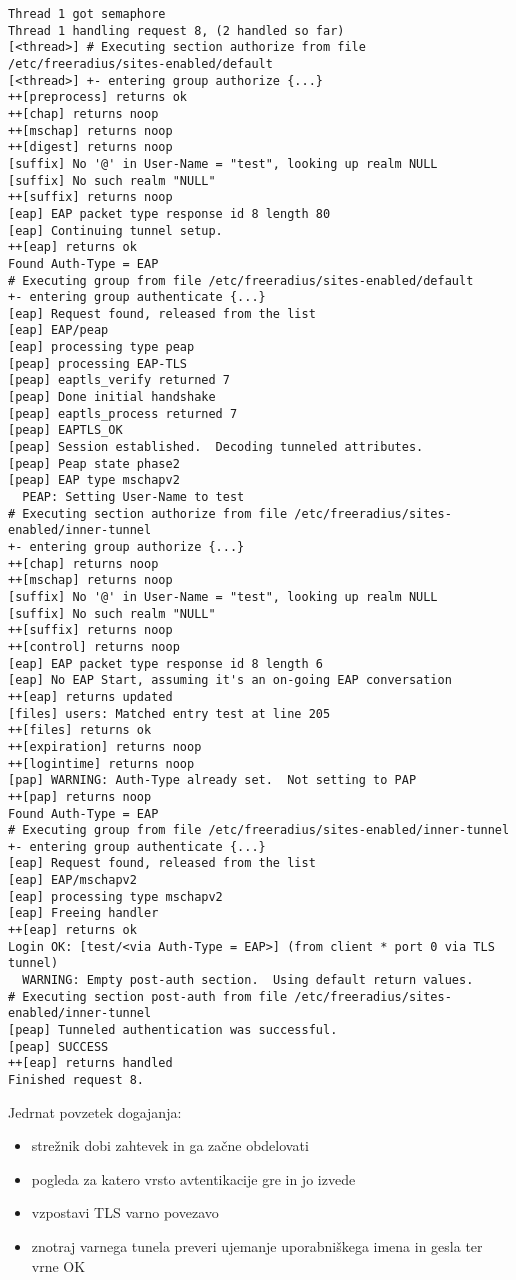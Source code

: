 \documentclass[12pt]{article}
\begin{document}
\begin{verbatim}
Thread 1 got semaphore
Thread 1 handling request 8, (2 handled so far)
[<thread>] # Executing section authorize from file /etc/freeradius/sites-enabled/default
[<thread>] +- entering group authorize {...}
++[preprocess] returns ok
++[chap] returns noop
++[mschap] returns noop
++[digest] returns noop
[suffix] No '@' in User-Name = "test", looking up realm NULL
[suffix] No such realm "NULL"
++[suffix] returns noop
[eap] EAP packet type response id 8 length 80
[eap] Continuing tunnel setup.
++[eap] returns ok
Found Auth-Type = EAP
# Executing group from file /etc/freeradius/sites-enabled/default
+- entering group authenticate {...}
[eap] Request found, released from the list
[eap] EAP/peap
[eap] processing type peap
[peap] processing EAP-TLS
[peap] eaptls_verify returned 7 
[peap] Done initial handshake
[peap] eaptls_process returned 7 
[peap] EAPTLS_OK
[peap] Session established.  Decoding tunneled attributes.
[peap] Peap state phase2
[peap] EAP type mschapv2
  PEAP: Setting User-Name to test
# Executing section authorize from file /etc/freeradius/sites-enabled/inner-tunnel
+- entering group authorize {...}
++[chap] returns noop
++[mschap] returns noop
[suffix] No '@' in User-Name = "test", looking up realm NULL
[suffix] No such realm "NULL"
++[suffix] returns noop
++[control] returns noop
[eap] EAP packet type response id 8 length 6
[eap] No EAP Start, assuming it's an on-going EAP conversation
++[eap] returns updated
[files] users: Matched entry test at line 205
++[files] returns ok
++[expiration] returns noop
++[logintime] returns noop
[pap] WARNING: Auth-Type already set.  Not setting to PAP
++[pap] returns noop
Found Auth-Type = EAP
# Executing group from file /etc/freeradius/sites-enabled/inner-tunnel
+- entering group authenticate {...}
[eap] Request found, released from the list
[eap] EAP/mschapv2
[eap] processing type mschapv2
[eap] Freeing handler
++[eap] returns ok
Login OK: [test/<via Auth-Type = EAP>] (from client * port 0 via TLS tunnel)
  WARNING: Empty post-auth section.  Using default return values.
# Executing section post-auth from file /etc/freeradius/sites-enabled/inner-tunnel
[peap] Tunneled authentication was successful.
[peap] SUCCESS
++[eap] returns handled
Finished request 8.
\end{verbatim}

Jedrnat povzetek dogajanja:

\begin{itemize}
  \item strežnik dobi zahtevek in ga začne obdelovati
  \item pogleda za katero vrsto avtentikacije gre in jo izvede
  \item vzpostavi TLS varno povezavo
  \item znotraj varnega tunela preveri ujemanje uporabniškega imena in gesla ter vrne OK
\end{itemize}
\end{document}
